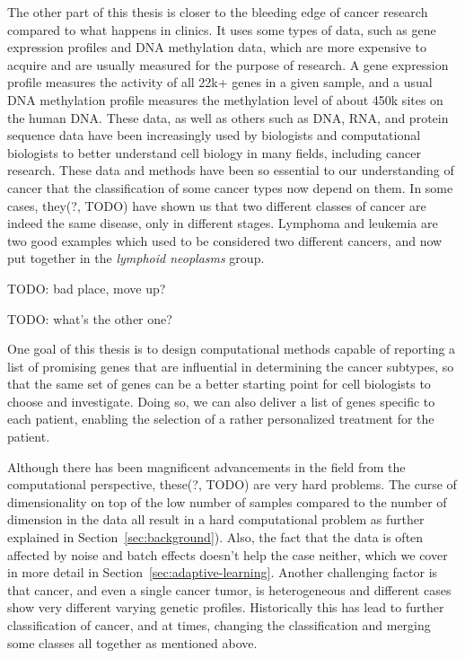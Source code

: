 The other part of this thesis is closer to the bleeding edge of cancer research
compared to what happens in clinics. It uses some types of data, such as gene
expression profiles and DNA methylation data, which are more expensive to
acquire and are usually measured for the purpose of research. A gene expression
profile measures the activity of all 22k+ genes in a given sample, and a usual
DNA methylation profile measures the methylation level of about 450k sites on
the human DNA. These data, as well as others such as DNA, RNA, and protein
sequence data have been increasingly used by biologists and computational
biologists to better understand cell biology in many fields, including cancer
research. These data and methods have been so essential to our understanding of
cancer that the classification of some cancer types now depend on them. In some
cases, they(?, TODO) have shown us that two different classes of cancer are
indeed the same disease, only in different stages. Lymphoma and leukemia are
two good examples which used to be considered two different cancers, and now
put together in the \emph{lymphoid neoplasms} group.

TODO: bad place, move up?

TODO: what's the other one?

One goal of this thesis is to design computational methods capable of reporting
a list of promising genes that are influential in determining the cancer
subtypes, so that the same set of genes can be a better starting point for cell
biologists to choose and investigate. Doing so, we can also deliver a list of
genes specific to each patient, enabling the selection of a rather personalized
treatment for the patient.

Although there has been magnificent advancements in the field from the
computational perspective, these(?, TODO) are very hard problems. The curse of
dimensionality on top of the low number of samples compared to the number of
dimension in the data all result in a hard computational problem as further
explained in Section~\ref{sec:background}). Also, the fact that the data is
often affected by noise and batch effects doesn't help the case neither, which
we cover in more detail in Section~\ref{sec:adaptive-learning}. Another
challenging factor is that cancer, and even a single cancer tumor, is
heterogeneous and different cases show very different varying genetic profiles.
Historically this has lead to further classification of cancer, and at times,
changing the classification and merging some classes all together as mentioned
above.

